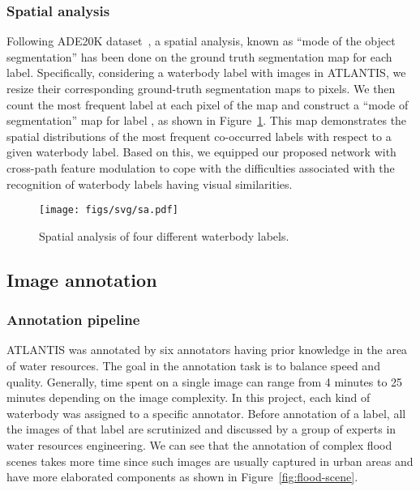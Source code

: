 \documentclass{article}
\begin{document}
\subsubsection{Spatial analysis} \label{subsubsec:spatial-analysis}
Following ADE20K dataset~\cite{zhou2019semantic}, a spatial analysis, known as ``mode of the object segmentation'' has been done on the ground truth segmentation map for each label. Specifically, considering a waterbody label  with  images in ATLANTIS, we resize their corresponding  ground-truth segmentation maps to  pixels. We then count the most frequent label at each pixel of the map and construct a ``mode of segmentation'' map for label , as shown in Figure~\ref{fig:spatial-analysis}. This map demonstrates the spatial distributions of the most frequent co-occurred labels with respect to a given waterbody label. Based on this, we equipped our proposed network with cross-path feature modulation to cope with the difficulties associated with the recognition of waterbody labels having visual similarities.

\begin{figure}[htbp]
    \centering
    \texttt{[image: figs/svg/sa.pdf]}
    \caption{Spatial analysis of four different waterbody labels.}
    \label{fig:spatial-analysis}
\end{figure}

\subsection{Image annotation} \label{subsubsec:image-annotation}

\subsubsection{Annotation pipeline}
ATLANTIS was annotated by six annotators having prior knowledge in the area of water resources. The goal in the annotation task is to balance speed and quality. Generally, time spent on a single image can range from 4 minutes to 25 minutes depending on the image complexity. In this project, each kind of waterbody was assigned to a specific annotator. Before annotation of a label, all the images of that label are scrutinized and discussed by a group of experts in water resources engineering. 
We can see that the annotation of complex flood scenes takes more time since such images are usually captured in urban areas and have more elaborated components as shown in Figure~\ref{fig:flood-scene}.  
\end{document}
